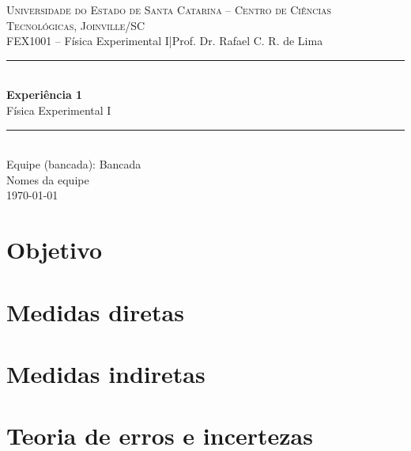\documentclass[a4paper,11pt]{article}
\newcommand{\experimento}{Experiência 1}
\newcommand{\subtitulo}{Física Experimental I}
\newcommand{\equipe}{Bancada}
\newcommand{\integrantes}{Nomes da equipe}
\newcommand{\datarelatorio}{\today}
\newcommand{\disciplina}{FEX1001 -- Física Experimental I}
\newcommand{\professor}{Prof. Dr. Rafael C. R. de Lima}
\newcommand{\instituicao}{Universidade do Estado de Santa Catarina --
Centro de Ciências Tecnológicas, Joinville/SC}
\begin{document}
\begin{center}
  {\large\scshape \instituicao}\\[2pt]
  {\small \disciplina \quad|\quad \professor}\\[14pt]
  \rule{\linewidth}{0.5pt}\\[10pt]
  {\LARGE\bfseries \experimento}\\[4pt]
  {\large \subtitulo}\\[10pt]
  \rule{\linewidth}{0.5pt}\\[10pt]
  {\normalsize Equipe (bancada): \equipe}\\[2pt]
  {\normalsize \integrantes}\\[2pt]
  {\small \datarelatorio}
\end{center}

\vspace{6pt}

\section{Objetivo}


\section{Medidas diretas}






\section{Medidas indiretas}






\section{Teoria de erros e incertezas}



\end{document}
